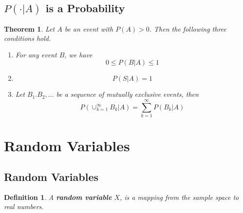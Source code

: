 \documentclass[12pt]{article}
\newtheorem{definition}{Definition}[section]
\newtheorem{theorem}{Theorem}[section]
\theoremstyle{definition}
\begin{document}
\subsection{$P(\cdot|A)$ is a Probability}
\begin{theorem}\normalfont Let $A$ be an event with $P(A)>0$. Then the following three conditions hold.
\begin{enumerate}
\item For any event $B$, we have
\[
0\leq P(B|A)\leq 1
\]
\item 
\[
P(S|A)=1
\]
\item Let $B_1.B_2,\ldots$ be a sequence of mutually exclusive events, then
\[
P(\cup_{k=1}^{\infty}B_k|A)=\sum_{k=1}^\infty P(B_k|A)
\]
\end{enumerate}
\end{theorem}
\clearpage
\section{Random Variables}
\subsection{Random Variables}
\begin{definition}\normalfont A \textbf{random variable} $X$, is a mapping from the sample space to real numbers.
\end{definition}
\end{document}
